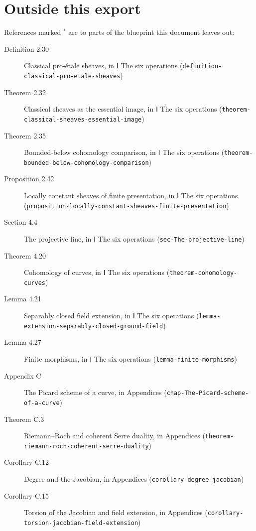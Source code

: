 \documentclass[11pt]{article}
\newcommand{\bpslug}[1]{\texttt{#1}}
\begin{document}
\clearpage{}\hypertarget{bp-outside}{}%
\section*{Outside this export}
References marked \ensuremath{{}^\ast} are to parts of the blueprint this document leaves out:
\begin{description}
\item[Definition 2.30] Classical pro-étale sheaves, in Ⅰ The six operations (\bpslug{definition-{}\allowbreak{}classical-{}\allowbreak{}pro-{}\allowbreak{}etale-{}\allowbreak{}sheaves})
\item[Theorem 2.32] Classical sheaves as the essential image, in Ⅰ The six operations (\bpslug{theorem-{}\allowbreak{}classical-{}\allowbreak{}sheaves-{}\allowbreak{}essential-{}\allowbreak{}image})
\item[Theorem 2.35] Bounded-below cohomology comparison, in Ⅰ The six operations (\bpslug{theorem-{}\allowbreak{}bounded-{}\allowbreak{}below-{}\allowbreak{}cohomology-{}\allowbreak{}comparison})
\item[Proposition 2.42] Locally constant sheaves of finite presentation, in Ⅰ The six operations (\bpslug{proposition-{}\allowbreak{}locally-{}\allowbreak{}constant-{}\allowbreak{}sheaves-{}\allowbreak{}finite-{}\allowbreak{}presentation})
\item[Section 4.4] The projective line, in Ⅰ The six operations (\bpslug{sec-{}\allowbreak{}The-{}\allowbreak{}projective-{}\allowbreak{}line})
\item[Theorem 4.20] Cohomology of curves, in Ⅰ The six operations (\bpslug{theorem-{}\allowbreak{}cohomology-{}\allowbreak{}curves})
\item[Lemma 4.21] Separably closed field extension, in Ⅰ The six operations (\bpslug{lemma-{}\allowbreak{}extension-{}\allowbreak{}separably-{}\allowbreak{}closed-{}\allowbreak{}ground-{}\allowbreak{}field})
\item[Lemma 4.27] Finite morphisms, in Ⅰ The six operations (\bpslug{lemma-{}\allowbreak{}finite-{}\allowbreak{}morphisms})
\item[Appendix C] The Picard scheme of a curve, in Appendices (\bpslug{chap-{}\allowbreak{}The-{}\allowbreak{}Picard-{}\allowbreak{}scheme-{}\allowbreak{}of-{}\allowbreak{}a-{}\allowbreak{}curve})
\item[Theorem C.3] Riemann–Roch and coherent Serre duality, in Appendices (\bpslug{theorem-{}\allowbreak{}riemann-{}\allowbreak{}roch-{}\allowbreak{}coherent-{}\allowbreak{}serre-{}\allowbreak{}duality})
\item[Corollary C.12] Degree and the Jacobian, in Appendices (\bpslug{corollary-{}\allowbreak{}degree-{}\allowbreak{}jacobian})
\item[Corollary C.15] Torsion of the Jacobian and field extension, in Appendices (\bpslug{corollary-{}\allowbreak{}torsion-{}\allowbreak{}jacobian-{}\allowbreak{}field-{}\allowbreak{}extension})
\end{description}
\clearpage{}%
\end{document}
